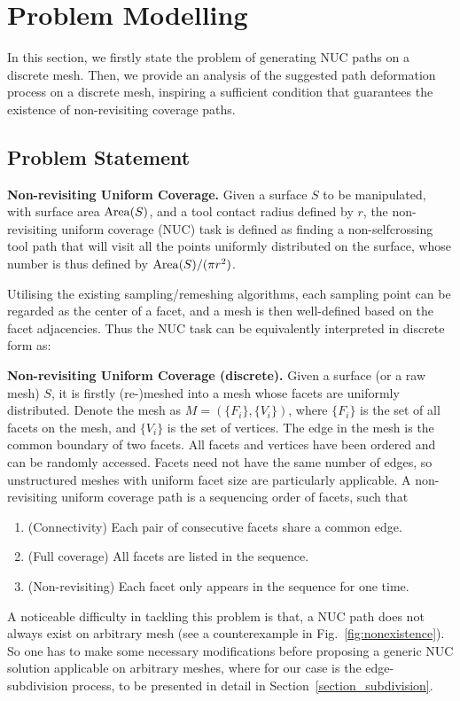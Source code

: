 \documentclass[lettersize,journal]{IEEEtran}
\begin{document}
\section{Problem Modelling}\label{section_problem_statement}
In this section, we firstly state the problem of generating NUC paths on a discrete mesh. 
Then, we provide an analysis of the suggested path deformation process on a discrete mesh, inspiring a sufficient condition that 
guarantees the existence of non-revisiting coverage paths. 

\subsection{Problem Statement}
\textbf{Non-revisiting Uniform Coverage. }
Given a surface $S$ to be manipulated, with surface area ${\rm Area}(S)$, and a tool contact radius defined by $r$, the non-revisiting uniform coverage (NUC) task is defined as finding a non-selfcrossing tool path that will visit all the points uniformly distributed on the surface, whose number is thus defined by ${\rm Area}(S)/(\pi r^2)$. 

Utilising the existing sampling/remeshing algorithms, each sampling point can be regarded as the center of a facet, and a mesh is then well-defined based on the facet adjacencies. Thus the NUC task can be equivalently interpreted in discrete form as: 

\textbf{Non-revisiting Uniform Coverage (discrete). }
Given a surface (or a raw mesh) $S$, it is firstly (re-)meshed into a mesh whose facets are uniformly distributed. 
Denote the mesh as $M = (\{F_i\}, \{V_i\})$, where $\{F_i\}$ is the set of all facets on the mesh, and $\{V_i\}$ is the set of vertices. 
The edge in the mesh is the common boundary of two facets. 
All facets and vertices have been ordered and can be randomly accessed. 
Facets need not have the same number of edges, so unstructured meshes with uniform facet size are particularly applicable. 
A non-revisiting uniform coverage path is a sequencing order of facets, such that
\begin{enumerate}
\item (Connectivity) Each pair of consecutive facets share a common edge. 
\item (Full coverage) All facets are listed in the sequence.
\item (Non-revisiting) Each facet only appears in the sequence for one time. 
\end{enumerate}
A noticeable difficulty in tackling this problem is that, a NUC path does not always exist on arbitrary mesh (see a counterexample in Fig.~\ref{fig:nonexistence}). 
So one has to make some necessary modifications before proposing a generic NUC solution applicable on arbitrary meshes, where for our case is the edge-subdivision process, to be presented in detail in Section~\ref{section_subdivision}. 
\end{document}

